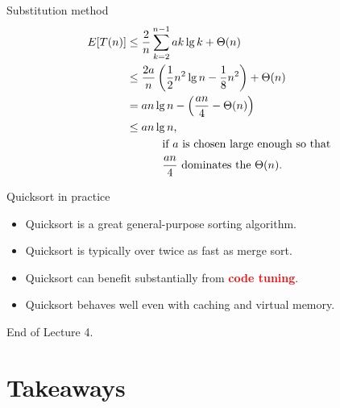 \documentclass{beamer}
\begin{document}
\begin{frame}{Substitution method}
    \begin{equation*}
        \begin{split}
        E[T(n)] &\leq \frac{2}{n}\sum\limits_{k=2}^{n-1} a k \lg k + \Theta(n) \\
                &\leq \frac{2a}{n} \left( \frac{1}{2}n^2 \lg n - \frac{1}{8}n^2 \right) + \Theta(n) \\
                &= a n \lg n - \left( \frac{an}{4} - \Theta(n) \right) \\
                &\leq a n \lg n \text{,} \\
                &\text{\hspace{10mm} if $a$ is chosen large enough so that} \\
                &\text{\hspace{10mm} $\frac{an}{4}$ dominates the $\Theta(n)$.}
        \end{split}
    \end{equation*}
\end{frame}

\begin{frame}{Quicksort in practice}
    \begin{itemize}
        \item Quicksort is a great general-purpose sorting algorithm.
        \item Quicksort is typically over twice as fast as merge sort.
        \item Quicksort can benefit substantially from \textcolor{red}{\textbf{code tuning}}.
        \item Quicksort behaves well even with caching and virtual memory.
    \end{itemize}
\end{frame}

\begin{frame}{}
    \centering
    \Huge End of Lecture 4.
\end{frame}

\section*{Takeaways}
\end{document}
